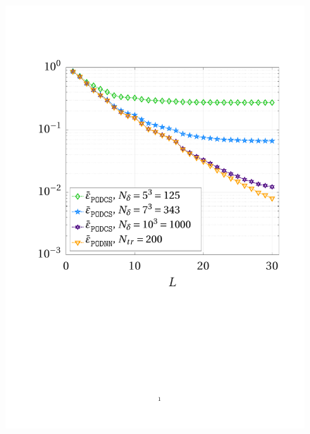 \documentclass[longtitle]{elsarticle}
\numberwithin{equation}{section}
\theoremstyle{theorem}
\theoremstyle{definition}
\theoremstyle{remark}
\theoremstyle{proposition}
\numberwithin{figure}{section}
\begin{document}
		\begin{figure}[b!]
			\center
			\includegraphics[scale = 0.38, trim = {1.5cm 9.34cm 1.5cm 3.8cm}, clip]{poisson2d_cs_error}
			\hspace*{1cm}

\end{figure}
\end{document}
